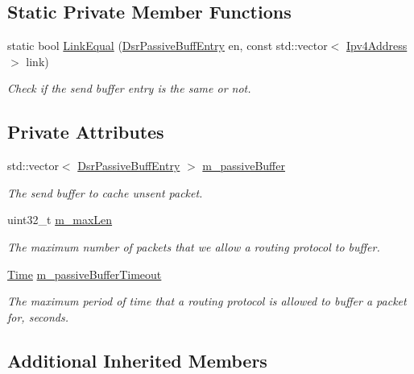 \subsection*{Static Private Member Functions}
\begin{DoxyCompactItemize}
\item 
static bool \hyperlink{classns3_1_1dsr_1_1DsrPassiveBuffer_aad57811e61deeafbf73ea73175d59e76}{Link\+Equal} (\hyperlink{classns3_1_1dsr_1_1DsrPassiveBuffEntry}{Dsr\+Passive\+Buff\+Entry} en, const std\+::vector$<$ \hyperlink{classns3_1_1Ipv4Address}{Ipv4\+Address} $>$ link)
\begin{DoxyCompactList}\small\item\em Check if the send buffer entry is the same or not. \end{DoxyCompactList}\end{DoxyCompactItemize}
\subsection*{Private Attributes}
\begin{DoxyCompactItemize}
\item 
std\+::vector$<$ \hyperlink{classns3_1_1dsr_1_1DsrPassiveBuffEntry}{Dsr\+Passive\+Buff\+Entry} $>$ \hyperlink{classns3_1_1dsr_1_1DsrPassiveBuffer_ab31ade1fb99b99f777a393ca21162535}{m\+\_\+passive\+Buffer}
\begin{DoxyCompactList}\small\item\em The send buffer to cache unsent packet. \end{DoxyCompactList}\item 
uint32\+\_\+t \hyperlink{classns3_1_1dsr_1_1DsrPassiveBuffer_a71c5e37beeec5c22e8d791f738d542fb}{m\+\_\+max\+Len}
\begin{DoxyCompactList}\small\item\em The maximum number of packets that we allow a routing protocol to buffer. \end{DoxyCompactList}\item 
\hyperlink{classns3_1_1Time}{Time} \hyperlink{classns3_1_1dsr_1_1DsrPassiveBuffer_a80d23b7cccce40b45429d3627f228db0}{m\+\_\+passive\+Buffer\+Timeout}
\begin{DoxyCompactList}\small\item\em The maximum period of time that a routing protocol is allowed to buffer a packet for, seconds. \end{DoxyCompactList}\end{DoxyCompactItemize}
\subsection*{Additional Inherited Members}


